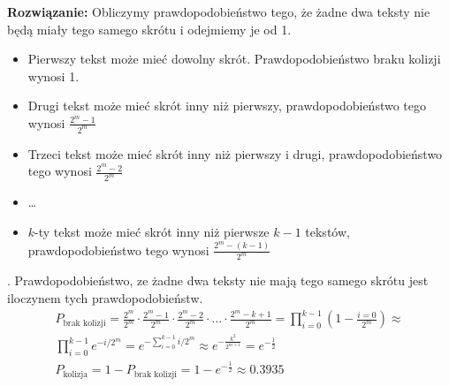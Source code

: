 \documentclass{article}
\begin{document}
\textbf{Rozwiązanie:} Obliczymy prawdopodobieństwo tego, że żadne dwa teksty nie będą miały tego samego skrótu i odejmiemy je od 1.
\begin{itemize}
    \item Pierwszy tekst może mieć dowolny skrót. Prawdopodobieństwo braku kolizji wynosi 1.
    \item Drugi tekst może mieć skrót inny niż pierwszy, prawdopodobieństwo tego wynosi $\frac{2^m-1}{2^m}$
    \item Trzeci tekst może mieć skrót inny niż pierwszy i drugi, prawdopodobieństwo tego wynosi $\frac{2^m-2}{2^m}$
    \item \dots
    \item $k$-ty tekst może mieć skrót inny niż pierwsze $k-1$ tekstów, prawdopodobieństwo tego wynosi $\frac{2^m-(k-1)}{2^m}$
\end{itemize}.
Prawdopodobieństwo, ze żadne dwa teksty nie mają tego samego skrótu jest iloczynem tych prawdopodobieństw.
\begin{equation}
\begin{matrix}
P_{\text{brak kolizji}} = \frac{2^m}{2^m} \cdot \frac{2^m-1}{2^m} \cdot \frac{2^m-2}{2^m} \cdot \dots \cdot \frac{2^m-k+1}{2^m} = \prod_{i=0}^{k-1}(1-\frac{i=0}{2^m}) \approx \\
\prod_{i=0}^{k-1}e^{-i/2^m} = e^{-\sum_{i=0}^{k-1}i/2^m} \approx e^{-\frac{k^2}{2^{m+1}}} = e^{-\frac{1}{2}} \\
P_{\text{kolizja}} = 1-P_{\text{brak kolizji}} = 1-e^{-\frac{1}{2}} \approx 0.3935
\end{matrix}
\end{equation}
\end{document}
